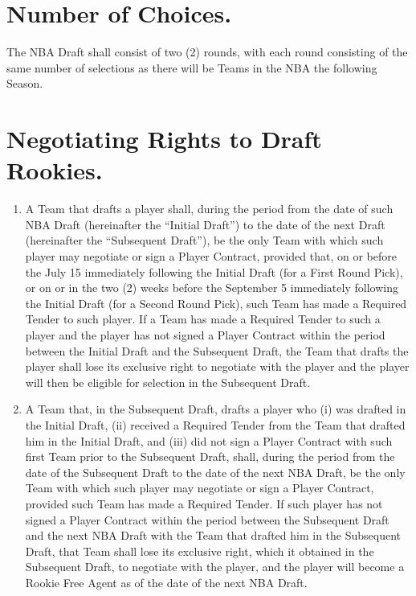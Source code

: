 \documentclass[
]{book}
\providecommand{\tightlist}{%
  \setlength{\itemsep}{0pt}\setlength{\parskip}{0pt}}
\begin{document}
\hypertarget{number-of-choices.}{%
\section{Number of Choices.}\label{number-of-choices.}}

The NBA Draft shall consist of two (2) rounds, with each round consisting of the same number of selections as there will be Teams in the NBA the following Season.

\hypertarget{negotiating-rights-to-draft-rookies.}{%
\section{Negotiating Rights to Draft Rookies.}\label{negotiating-rights-to-draft-rookies.}}

\begin{enumerate}
\def\labelenumi{(\alph{enumi})}
\tightlist
\item
  A Team that drafts a player shall, during the period from the date of such NBA Draft (hereinafter the ``Initial Draft'') to the date of the next Draft (hereinafter the ``Subsequent Draft''), be the only Team with which such player may negotiate or sign a Player Contract, provided that, on or before the July 15 immediately following the Initial Draft (for a First Round Pick), or on or in the two (2) weeks before the September 5 immediately following the Initial Draft (for a Second Round Pick), such Team has made a Required Tender to such player. If a Team has made a Required Tender to such a player and the player has not signed a Player Contract within the period between the Initial Draft and the Subsequent Draft, the Team that drafts the player shall lose its exclusive right to negotiate with the player and the player will then be eligible for selection in the Subsequent Draft.
\item
  A Team that, in the Subsequent Draft, drafts a player who (i) was drafted in the Initial Draft, (ii) received a Required Tender from the Team that drafted him in the Initial Draft, and (iii) did not sign a Player Contract with such first Team prior to the Subsequent Draft, shall, during the period from the date of the Subsequent Draft to the date of the next NBA Draft, be the only Team with which such player may negotiate or sign a Player Contract, provided such Team has made a Required Tender. If such player has not signed a Player Contract within the period between the Subsequent Draft and the next NBA Draft with the Team that drafted him in the Subsequent Draft, that Team shall lose its exclusive right, which it obtained in the Subsequent Draft, to negotiate with the player, and the player will become a Rookie Free Agent as of the date of the next NBA Draft.

\end{enumerate}
\end{document}
